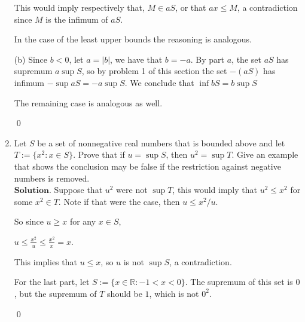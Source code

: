 \documentclass{article}
\theoremstyle{remark}
\begin{document}
\begin{enumerate}
            This would imply respectively that, $M \in aS$, or that
            $ax \leq M$, a contradiction since $M$ is the infimum of $aS$.

            In the case of the least upper bounds the reasoning is analogous.

            (b) Since $b < 0$, let $a = \vert b \vert$, we have that $b = -a$.
            By part $a$, the set $aS$ has supremum $a \sup S$, so by problem 1 of this section the set
            $-(aS)$ has infimum $-\sup aS = -a\sup S$. We conclude that $\inf bS = b \sup S$

            The remaining case is analogous as well.
            \begin{flushright}
                \qed
            \end{flushright}

            \item Let \( S \) be a set of nonnegative real numbers that is bounded above and let \( T := \{x^2 : x \in S\} \). 
            Prove that if \( u = \sup S \), then \( u^2 = \sup T \). Give an example that shows the conclusion may be false if the restriction against negative numbers is removed.\\
            $\textbf{Solution.}$
            Suppose that $u^2$ were not $\sup T$, this would imply that $u^2 \leq x^2$ for some $x^2 \in T$.
            Note if that were the case, then $u \leq x^2/u$.
            
            So since $u \geq x$ for any $x \in S$,
            \begin{center}
                $\displaystyle u \leq \frac{x^2}{u} \leq \frac{x^2}{x} = x$.
            \end{center}
            This implies that $u \leq x$, so $u$ is not $\sup S$, a contradiction.

            For the last part, let $S := \{x \in \mathbb{R} : -1 < x < 0\}$.
            The supremum of this set is $0$, but the supremum of $T$ should be $1$, which is not $0^2$.
            \begin{flushright}
                \qed
            \end{flushright}


\end{enumerate}
\end{document}
